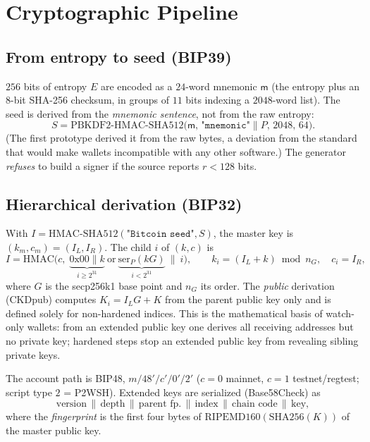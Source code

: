 \documentclass[11pt,a4paper]{article}
\theoremstyle{plain}
\theoremstyle{definition}
\begin{document}
\section{Cryptographic Pipeline}\label{sec:pipeline}

\subsection{From entropy to seed (BIP39)}

$256$ bits of entropy $E$ are encoded as a $24$-word mnemonic $\mathsf{m}$
(the entropy plus an $8$-bit SHA-256 checksum, in groups of $11$ bits indexing
a $2048$-word list). The seed is derived from the \emph{mnemonic sentence},
not from the raw entropy:
\begin{equation}
    S=\mathrm{PBKDF2\text{-}HMAC\text{-}SHA512}\big(\mathsf{m},\,\texttt{"mnemonic"}\|P,\,2048,\,64\big).
\end{equation}
(The first prototype derived it from the raw bytes, a deviation from the
standard that would make wallets incompatible with any other software.)
The generator \emph{refuses} to build a signer if the source reports
$r<128$ bits.

\subsection{Hierarchical derivation (BIP32)}

With $I=\mathrm{HMAC\text{-}SHA512}(\texttt{"Bitcoin seed"},S)$, the master key
is $(k_m,c_m)=(I_L,I_R)$. The child $i$ of $(k,c)$ is
\begin{equation}
    I=\mathrm{HMAC}\big(c,\;\underbrace{0\mathrm{x}00\|k}_{i\ge2^{31}}\ \text{or}\ \underbrace{\mathrm{ser}_P(kG)}_{i<2^{31}}\ \|\ i\big),\qquad
    k_i=(I_L+k)\bmod n_G,\quad c_i=I_R,
\end{equation}
where $G$ is the secp256k1 base point and $n_G$ its order. The \emph{public}
derivation (CKDpub) computes $K_i=I_L G+K$ from the parent public key only and
is defined solely for non-hardened indices. This is the mathematical basis of
watch-only wallets: from an extended public key one derives all receiving
addresses but no private key; hardened steps stop an extended public key from
revealing sibling private keys.

The account path is BIP48, $m/48'/c'/0'/2'$ ($c=0$ mainnet, $c=1$
testnet/regtest; script type $2$ = P2WSH). Extended keys are serialized
(Base58Check) as
\begin{equation}
\text{version}\,\|\,\text{depth}\,\|\,\text{parent fp.}\,\|\,\text{index}\,\|\,\text{chain code}\,\|\,\text{key},
\end{equation}
where the \emph{fingerprint} is the first four bytes of
$\mathrm{RIPEMD160}(\mathrm{SHA256}(K))$ of the master public key.
\end{document}
